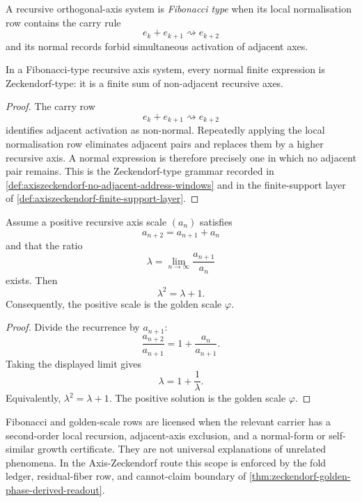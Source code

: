 \begin{definition}
\label{def:fibonacci-type-recursive-axis-system}
A recursive orthogonal-axis system is \emph{Fibonacci type} when its
local normalisation row contains the carry rule
$$
e_k+e_{k+1}\rightsquigarrow e_{k+2}
$$
and its normal records forbid simultaneous activation of adjacent axes.
\end{definition}

\begin{theorem}
\label{thm:fibonacci-type-normal-forms-zeckendorf-type}
In a Fibonacci-type recursive axis system, every normal finite
expression is Zeckendorf-type: it is a finite sum of non-adjacent
recursive axes.
\end{theorem}

\begin{proof}
The carry row
$$
e_k+e_{k+1}\rightsquigarrow e_{k+2}
$$
identifies adjacent activation as non-normal. Repeatedly applying the
local normalisation row eliminates adjacent pairs and replaces them by a
higher recursive axis. A normal expression is therefore precisely one in
which no adjacent pair remains. This is the Zeckendorf-type grammar
recorded in
\autoref{def:axiszeckendorf-no-adjacent-address-windows} and in the
finite-support layer of
\autoref{def:axiszeckendorf-finite-support-layer}.
\end{proof}

\begin{theorem}
\label{thm:golden-scale-second-order-local-recursion}
Assume a positive recursive axis scale $(a_n)$ satisfies
$$
a_{n+2}=a_{n+1}+a_n
$$
and that the ratio
$$
\lambda=\lim_{n\to\infty}\frac{a_{n+1}}{a_n}
$$
exists. Then
$$
\lambda^2=\lambda+1.
$$
Consequently, the positive scale is the golden scale $\varphi$.
\end{theorem}

\begin{proof}
Divide the recurrence by $a_{n+1}$:
$$
\frac{a_{n+2}}{a_{n+1}}
=
1+\frac{a_n}{a_{n+1}}.
$$
Taking the displayed limit gives
$$
\lambda=1+\frac{1}{\lambda}.
$$
Equivalently, $\lambda^2=\lambda+1$. The positive solution is the
golden scale $\varphi$.
\end{proof}

\begin{principle}
\label{prin:fibonacci-golden-appearance-scope}
Fibonacci and golden-scale rows are licensed when the relevant carrier
has a second-order local recursion, adjacent-axis exclusion, and a
normal-form or self-similar growth certificate. They are not universal
explanations of unrelated phenomena. In the Axis-Zeckendorf route this
scope is enforced by the fold ledger, residual-fiber row, and
cannot-claim boundary of
\autoref{thm:zeckendorf-golden-phase-derived-readout}.
\end{principle}

